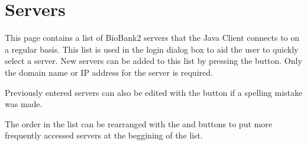 \section{Servers}
This page contains a list of BioBank2 servers that the Java Client connects to
on a regular basis. This list is used in the login dialog box to aid the user
to quickly select a server. New servers can be added to this list by pressing
the  button. Only the domain name or IP address for the server is
required.

Previously entered servers can also be edited with the  button if a
spelling mistake was made.

The order in the list can be rearranged with the  and 
buttons to put more frequently accessed servers at the beggining of the list.


